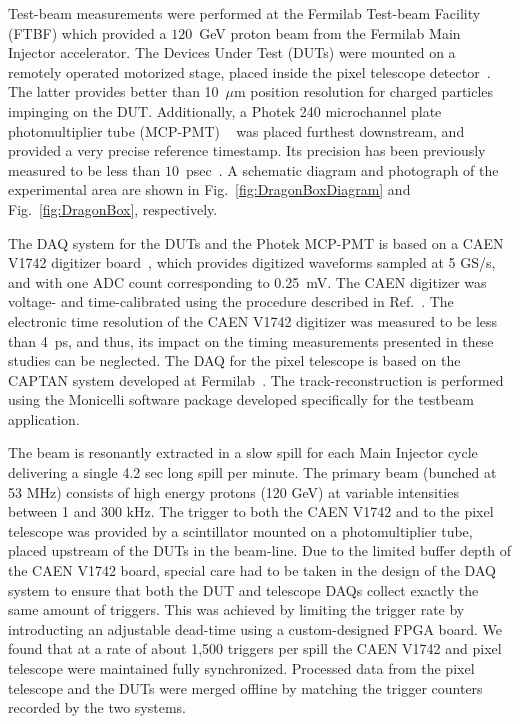 \documentclass[preprint,1p]{elsarticle}
\begin{document}
Test-beam measurements were performed at the Fermilab Test-beam Facility
(FTBF) which provided a $120$~GeV proton beam from the Fermilab Main Injector accelerator. The Devices Under Test (DUTs) were mounted on a remotely operated
motorized stage, placed inside the pixel telescope
detector~\cite{KWAN2016162}. The latter provides better than 10~$\mu$m
position resolution for charged particles impinging on the
DUT. Additionally, a Photek 240 microchannel plate
photomultiplier tube (MCP-PMT)%
~\cite{Anderson:2015gha, MCPFastCaloNIMA, Ronzhin2015288,Ronzhin201552}
was placed furthest downstream, and provided a very precise reference
timestamp. Its precision %
 has been previously measured to be less than
$10$~psec~\cite{Ronzhin2015288}. A schematic diagram and photograph of the experimental area are shown
in Fig.~\ref{fig:DragonBoxDiagram} and Fig.~\ref{fig:DragonBox}, respectively. 

The DAQ system for the DUTs and the Photek MCP-PMT is based on a CAEN V1742
digitizer board~\cite{CAENDRS}, which provides digitized waveforms sampled at 5
GS/s, and with one ADC count corresponding to 0.25~mV. The CAEN digitizer was voltage-
and time-calibrated using the procedure described in Ref.~\cite{Kim201467}. The
electronic time resolution of the CAEN V1742 digitizer was
measured to be less than 4~ps, and thus, its impact on the timing measurements presented in these studies
can be neglected. The DAQ for the pixel telescope is based on the CAPTAN system
developed at Fermilab~\cite{KWAN2016162}. The track-reconstruction is performed
using the Monicelli software package developed specifically for the testbeam
application. 

The beam is resonantly extracted in a slow spill for each Main Injector cycle
delivering a single 4.2 sec long spill per minute. The primary beam (bunched at
53 MHz) consists of high energy protons (120 GeV) at variable intensities
between 1 and 300 kHz. The trigger to both the CAEN V1742 and to the pixel
telescope was provided by a scintillator mounted on a photomultiplier tube,
placed upstream of the DUTs in the beam-line. Due to the limited buffer depth of
the CAEN V1742 board, special care had to be taken in the design of the DAQ
system to ensure that both the DUT and telescope DAQs collect exactly the same
amount of triggers. This was achieved by limiting the trigger rate by
introducting an adjustable dead-time using a custom-designed FPGA board. We
found that at a rate of about 1,500 triggers per spill the CAEN V1742 and pixel
telescope were maintained fully synchronized. Processed data from the pixel
telescope and the DUTs were merged offline by matching the trigger counters
recorded by the two systems.
\end{document}
